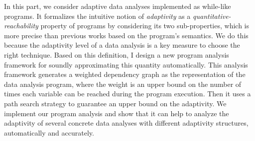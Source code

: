 
In this part, we consider adaptive data analyses implemented as while-like programs.
It formalizes the intuitive notion of \emph{adaptivity} as a
 \emph{quantitative-reachability} property of programs by considering its two sub-properties,
which is more precise than previous works based on the program's semantics.
We do this because the adaptivity level of a data analysis is a key measure to choose the right technique. 
Based on this definition, I design a new program analysis framework for soundly approximating this quantity automatically.
This analysis framework generates a weighted dependency graph as the representation of the data analysis program,
where the weight is an upper bound on the number of times each variable can be reached during the program execution.
Then it uses a path search strategy to guarantee an upper bound on the adaptivity. 
We implement our program analysis and show that it can help to analyze the adaptivity of several
concrete data analyses with different adaptivity structures, automatically and accurately.
